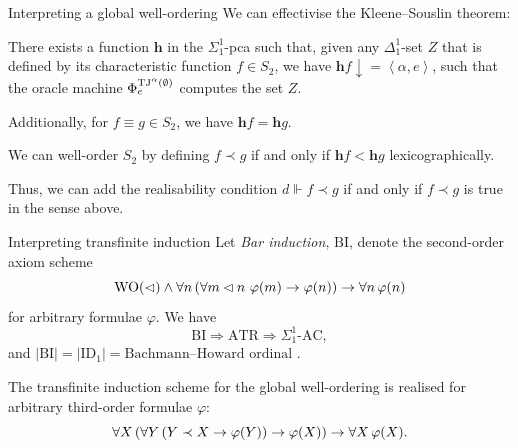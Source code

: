 \documentclass{beamer}
\newcommand{\tuple}[1]{\left\langle #1 \right\rangle}
\begin{document}
\begin{frame}{Interpreting a global well-ordering}
  We can effectivise the Kleene--Souslin theorem:

  \begin{theorem}
    There exists a function $\mathbf{h}$ in the $\Sigma^1_1$-pca such that, given any $\Delta^1_1$-set $Z$ that is defined by its characteristic function $f \in S_2$, we have $\mathbf{h} f {\downarrow} = \tuple{\alpha, e}$, such that the oracle machine $\Phi^{\mathrm{TJ}^\alpha\mleft(\emptyset\mright)}_e$ computes the set $Z$.

    \vspace{0.6em}

    Additionally, for $f \equiv g \in S_2$, we have $\mathbf{h} f = \mathbf{h} g$.
  \end{theorem}

  We can well-order $S_2$ by defining $f \prec g$ if and only if $\mathbf{h} f < \mathbf{h} g$ lexicographically.

  \vspace{1em}

  Thus, we can add the realisability condition $d \Vdash f \prec g$ if and only if $f \prec g$ is true in the sense above.
\end{frame}

\begin{frame}{Interpreting transfinite induction}
  Let \emph{Bar induction}, $\mathrm{BI}$, denote the second-order axiom scheme
  \[\mathrm{WO}\mleft(\lhd\mright) \land \forall n \left(\forall m \lhd n \ \varphi\mleft(m\mright) \rightarrow \varphi\mleft(n\mright)\right) \rightarrow \forall n \, \varphi\mleft(n\mright)\]
  for arbitrary formulae $\varphi$. We have
  \[\mathrm{BI} \Rightarrow \mathrm{ATR} \Rightarrow \Sigma^1_1\text{-}\mathrm{AC},\]
  and $\left|\mathrm{BI}\right| = \left|\mathrm{ID}_1\right| = \text{Bachmann--Howard ordinal}$ \cite{buchholz-pohlers78-iterated-id}.

  \pause

  \begin{lemma}[$\mathrm{BI}$]
    The transfinite induction scheme for the global well-ordering is realised for arbitrary third-order formulae $\varphi$:
    \[\forall X \left(\forall Y \left(Y \prec X \rightarrow \varphi\mleft(Y\mright)\right) \rightarrow \varphi\mleft(X\mright)\right) \rightarrow \forall X \, \varphi\mleft(X\mright).\]
  \end{lemma}
\end{frame}
\end{document}
